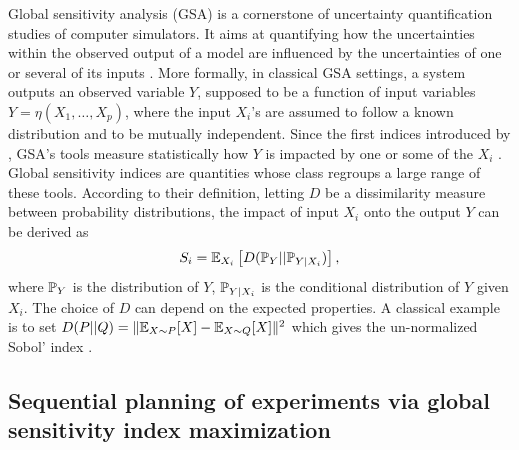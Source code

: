 Global sensitivity analysis (GSA) %
{is a cornerstone of uncertainty quantification studies of computer simulators}. It aims at quantifying how the uncertainties within the observed output of a model are influenced by the uncertainties of one or several of its inputs \citep{iooss_review_2015}.
More formally, in classical GSA settings, a system outputs an observed variable $Y$, supposed to be a function of input variables $Y=\eta(X_1,\dots,X_p)$, where the input $X_i$'s are assumed to follow a known distribution and to be mutually independent. 
Since the first indices introduced by \citet{sobol_sensitivity_1993}, GSA's tools measure statistically how $Y$ is impacted by one or some of the $X_i$ \citep{da_veiga_basics_2021}.
Global sensitivity indices \citep{da_veiga_global_2015} are quantities whose class regroups a large range of these tools.
%
According to their definition, letting $D$ be a dissimilarity measure between probability distributions, the impact of input $X_i$ onto the output $Y$ can be derived as
    \begin{equation}
        S_i = \mathbb{E}_{X_i}\left[D(\mathbb{P}_{Y}||\mathbb{P}_{Y|X_i})\right] ,
    \end{equation}
where $\mathbb{P}_Y$ is the distribution of $Y$, $\mathbb{P}_{Y|X_i}$ is the conditional distribution of $Y$ given $X_i$. The choice of $D$ can depend on the expected properties. A classical example is to set $D(P||Q)=\|\mathbb{E}_{X\sim P}[X]-\mathbb{E}_{X\sim Q}[X]\|^2$ which gives the un-normalized Sobol' index \citep{sobol_sensitivity_1993}.



\subsection{Sequential planning of experiments via global sensitivity index maximization}

